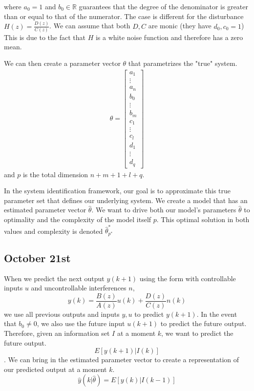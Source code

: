 \documentclass[11pt]{article}
\begin{document}
where $a_0 = 1$ and $b_0 \in \mathbb{R}$ guarantees that the degree of the denominator is greater than or equal to that of the numerator.
The case is different for the disturbance $H(z) = \frac{D(z)}{C(z)}$.
We can assume that both $D,C$ are monic (they have $d_0, c_0 = 1$)
This is due to the fact that $H$ is a white noise function and therefore has a zero mean.

We can then create a parameter vector $\theta$ that parametrizes the "true" system.
\begin{align}
  \theta = 
  \begin{bmatrix}
    a_1 \\ \vdots \\ a_n \\ b_0 \\ \vdots \\ b_m \\ c_1 \\ \vdots \\ c_l \\ d_1 \\ \vdots \\ d_q
  \end{bmatrix}
\end{align}
and $p$ is the total dimension $n+m+1+l+q$.

In the system identification framework, our goal is to approximate this true parameter set that defines our underlying system.
We create a model that has an estimated parameter vector $\hat{\theta}$.
We want to drive both our model's parameters $\hat{\theta}$ to optimality and the complexity of the model itself $p$.
This optimal solution in both values and complexity is denoted $\hat{\theta}_{p^*}^*$

\subsection{October 21st}
When we predict the next output $y(k+1)$ using the form with controllable inputs $u$ and uncontrollable interferences $n$, 
\begin{equation}
    y(k) = \frac{B(z)}{A(z)} u(k) + \frac{D(z)}{C(z)} n(k)
\end{equation}
we use all previous outputs and inputs $y, u$ to predict $y(k+1)$.
In the event that $b_0 \neq 0$, we also use the future input $u(k+1)$ to predict the future output.
Therefore, given an information set $I$ at a moment $k$, we want to predict the future output.
\begin{equation}
    E[y(k+1) | I(k)]
\end{equation}.
We can bring in the estimated parameter vector to create a representation of our predicted output at a moment $k$.
\begin{equation}
    \hat{y} (k | \hat{\theta}) = E[y(k) | I(k-1)]
\end{equation}
\end{document}
